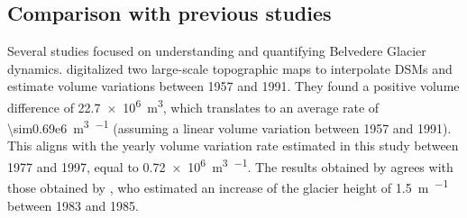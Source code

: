 \subsection{Comparison with previous studies}

Several studies focused on understanding and quantifying Belvedere Glacier dynamics. 
\citet{Diolaiuti2003} digitalized two large-scale topographic maps to interpolate DSMs and estimate volume variations between 1957 and 1991. 
They found a positive volume difference of \SI{+22.7e6}{\cubic\meter}, which translates to an average rate of \SI{\sim0.69e6}{\cubic\meter\per\year} (assuming a linear volume variation between 1957 and 1991). 
This aligns with the yearly volume variation rate estimated in this study between 1977 and 1997, equal to \SI{+0.72e6}{\cubic\meter\per\year}.
The results obtained by \citet{Diolaiuti2003} agrees with those obtained by \citet{Roethlisberger1985}, who estimated an increase of the glacier height of 
\SI{+1.5}{\meter\per\year} between 1983 and 1985.

\makechapterbibliography{}